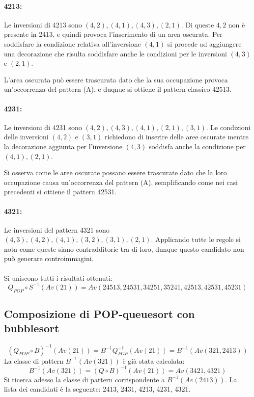 \paragraph*{4213:}Le inversioni di 4213 sono $(4,2),(4,1),(4,3),(2,1)$. Di queste $4,2$ non \`e presente in 2413, e quindi provoca l'inserimento di un area oscurata. Per soddisfare la condizione relativa all'inversione $(4,1)$ si procede ad aggiungere una decorazione che  risulta soddisfare anche le condizioni per le inversioni $(4,3)$ e $(2,1)$.
\begin{center}
\end{center}
L'area oscurata pu\`o essere trascurata dato che la sua occupazione provoca un'occorrenza del pattern (A), e duqnue si ottiene il pattern classico 42513.
\paragraph*{4231:} Le inversioni di 4231 sono $(4,2),(4,3),(4,1),(2,1),(3,1)$. Le condizioni delle inversioni $(4,2)$ e $(3,1)$ richiedono di inserire delle aree oscurate mentre la decorazione aggiunta per l'inversione $(4,3)$ soddisfa anche la condizione per $(4,1),(2,1)$.
\begin{center}
\end{center}
Si osserva come le aree oscurate possano essere trascurate dato che la loro occupazione causa un'occorrenza del pattern (A), semplificando come nei casi precedenti si ottiene il pattern 42531.
\paragraph*{4321:} Le inversioni del pattern 4321 sono $(4,3),(4,2),(4,1),(3,2),(3,1),(2,1)$. Applicando tutte le regole si nota come queste siano contradditorie tra di loro, dunque questo candidato non pu\`o generare controimmagini.
\\\\Si uniscono tutti i risultati ottenuti:
$$Q_{POP}\circ S^{-1}(Av(21)) = Av(24513, 24531, 34251, 35241, 42513, 42531, 45231)$$
\subsection{Composizione di {POP-queuesort} con {bubblesort}}
$$(Q_{POP}\circ {B})^{-1}(Av(21)) = B^{-1}Q_{POP}^{-1}(Av(21))=B^{-1}(Av(321,2413))$$
La classe di pattern $B^{-1}(Av(321))$ \`e gi\`a stata calcolata:
$$B^{-1}(Av(321)) = (Q\circ B)^{-1}(Av(21)) = Av(3421, 4321)$$
Si ricerca adesso la classe di pattern corrispondente a $B^{-1}(Av(2413))$. La lista dei candidati \`e la seguente: 2413, 2431, 4213, 4231, 4321.
